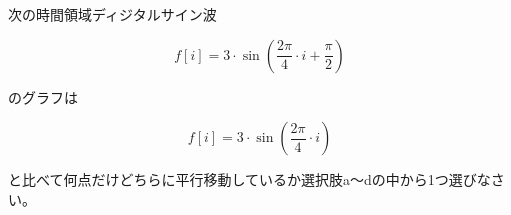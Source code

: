 次の時間領域ディジタルサイン波 

\[
f[i] = 3 \cdot \sin \left ( \frac{2 \pi}{4}  \cdot i + \frac{\pi}{2} \right )
\]

\noindent のグラフは

\[
f[i] = 3 \cdot \sin \left ( \frac{2 \pi}{4}  \cdot i \right )
\]

\noindent と比べて何点だけどちらに平行移動しているか選択肢a〜dの中から1つ選びなさい。
